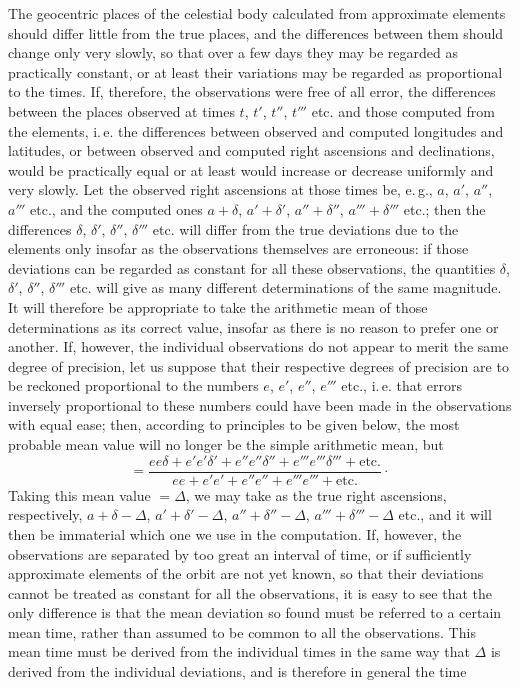 The geocentric places of the celestial body calculated from approximate elements should differ little from the true places, and the differences between them should change only very slowly, so that over a few days they may be regarded as practically constant, or at least their variations may be regarded as proportional to the times. If, therefore, the observations were free of all error, the differences between the places observed at times $t$, $t'$, $t''$, $t'''$ etc. and those computed from the elements, i.\,e. the differences between observed and computed longitudes and latitudes, or between observed and computed right ascensions and declinations, would be practically equal or at least would increase or decrease uniformly and very slowly. Let the observed right ascensions at those times be, e.\,g., $a$, $a'$, $a''$, $a'''$ etc., and the computed ones $a+\delta$, $a'+\delta'$, $a''+\delta''$, $a'''+\delta'''$ etc.; then the differences $\delta$, $\delta'$, $\delta''$, $\delta'''$ etc. will differ from the true deviations due to the elements only insofar as the observations themselves are erroneous: if those deviations can be regarded as constant for all these observations, the quantities $\delta$, $\delta'$, $\delta''$, $\delta'''$ etc. will give as many different determinations of the same magnitude. It will therefore be appropriate to take the arithmetic mean of those determinations as its correct value, insofar as there is no reason to prefer one or another. If, however, the individual observations do not appear to merit the same degree of precision, let us suppose that their respective degrees of precision are to be reckoned proportional to the numbers $e$, $e'$, $e''$, $e'''$ etc., i.\,e. that errors inversely proportional to these numbers could have been made in the observations with equal ease; then, according to principles to be given below, the most probable mean value will no longer be the simple arithmetic mean, but
\[
=\frac{ee\delta+e'e'\delta'+e''e''\delta''+e'''e'''\delta'''+\text{etc.}}
{ee+e'e'+e''e''+e'''e'''+\text{etc.}}\mathpunct{\cdot}
\]
Taking this mean value $=\Delta$, we may take as the true right ascensions, respectively, $a+\delta-\Delta$, $a'+\delta'-\Delta$, $a''+\delta''-\Delta$, $a'''+\delta'''-\Delta$ etc., and it will then be immaterial which one we use in the computation. If, however, the observations are separated by too great an interval of time, or if sufficiently approximate elements of the orbit are not yet known, so that their deviations cannot be treated as constant for all the observations, it is easy to see that the only difference is that the mean deviation so found must be referred to a certain mean time, rather than assumed to be common to all the observations. This mean time must be derived from the individual times in the same way that $\Delta$ is derived from the individual deviations, and is therefore in general the time
